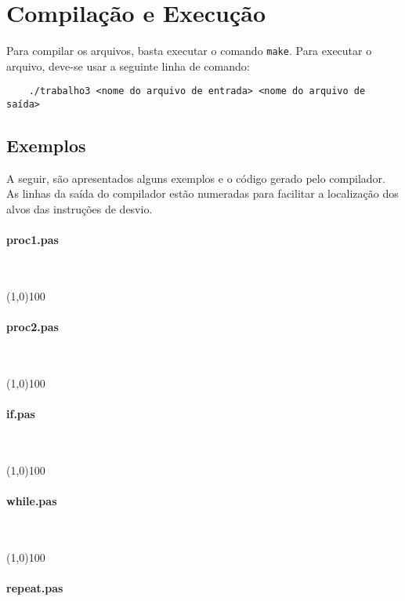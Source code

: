 \section{Compilação e Execução}
	Para compilar os arquivos, basta executar o comando \texttt{make}. Para
executar o arquivo, deve-se usar a seguinte linha de comando:
\begin{verbatim}
	./trabalho3 <nome do arquivo de entrada> <nome do arquivo de saída>
\end{verbatim}

\subsection{Exemplos}
A seguir, são apresentados alguns exemplos e o código gerado pelo compilador.
As linhas da saída do compilador estão numeradas para facilitar a localização
dos alvos das instruções de desvio.
\begin{multicols}{2}
\paragraph{proc1.pas}~
\scriptsize


\normalsize

\line(1,0){100}
\paragraph{proc2.pas}~
\scriptsize


\normalsize

\line(1,0){100}
\paragraph{if.pas}~
\scriptsize


\normalsize

\line(1,0){100}
\paragraph{while.pas}~
\scriptsize


\normalsize

\line(1,0){100}
\paragraph{repeat.pas}~
\scriptsize


\normalsize

\end{multicols}
